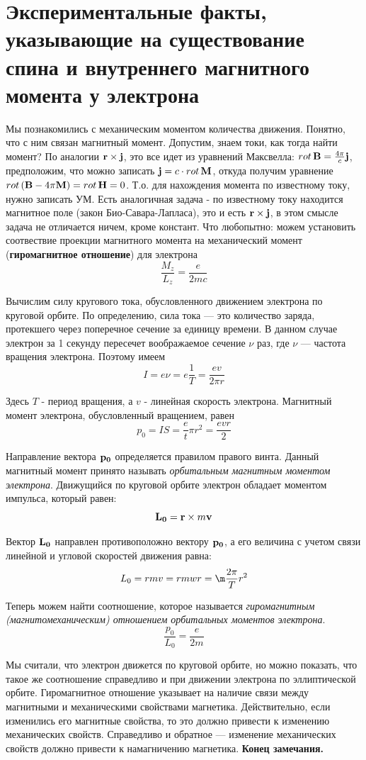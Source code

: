 \newpage
\chapter{Экспериментальные факты, указывающие на существование спина и внутреннего магнитного момента у электрона}
\par Мы познакомились с механическим моментом количества движения. Понятно, что с ним связан магнитный момент. Допустим, знаем токи, как тогда найти момент? По аналогии $\vb{r} \times \vb{j}$, это все идет из уравнений Максвелла: $rot \, \vb{B} = \frac{4 \pi}{c} \vb{j}$, предположим, что можно записать $\vb{j}=c \cdot rot \, \vb{M}$, откуда получим уравнение $rot \left( \vb{B} -4 \pi \vb{M} \right) = rot \, \vb{H} = 0$. Т.о. для нахождения момента по известному току, нужно записать УМ. Есть аналогичная задача - по известному току находится магнитное поле (закон Био-Савара-Лапласа), это и есть $\vb{r} \times \vb{j}$, в этом смысле задача не отличается ничем, кроме констант. Что любопытно: можем установить соотвествие проекции магнитного момента на механический момент (\textbf{гиромагнитное отношение}) для электрона 
$$\frac{M_z}{L_z} =\frac{e}{2mc}$$
\par \begin{remark}  Вычислим силу кругового тока, обусловленного движением электрона по круговой орбите. По определению, сила тока — это количество заряда, протекшего через поперечное сечение за единицу времени. В данном случае электрон за 1 секунду пересечет воображаемое сечение $\nu$ раз, где $\nu$ — частота вращения электрона. Поэтому имеем
$$I = e \nu = e \frac{1}{T} = \frac{e v}{2 \pi r}$$
\par Здесь $T$ - период вращения, а $v$ - линейная скорость электрона. Магнитный момент электрона, обусловленный вращением, равен
$$p_0 = I S = \frac{e}{t}\pi r^2= \frac{e v r}{2}$$
\par Направление вектора $\vb{p_0}$ определяется правилом правого винта. Данный магнитный момент принято называть \textit{орбитальным магнитным моментом электрона}. Движущийся по круговой орбите электрон обладает моментом импульса, который равен:
$$\vb{L_0} = \vb{r} \times m\vb{v}$$
\par Вектор $\vb{L_0}$ направлен противоположно вектору $\vb{p_0}$, а его величина с учетом связи линейной и угловой скоростей движения равна:
$$L_0 = rmv = rmwr = \m \frac{2\pi}{T}r^2 $$
\par Теперь можем найти соотношение, которое называется \textit{гиромагнитным (магнитомеханическим) отношением орбитальных моментов электрона}.
$$\frac{p_0}{L_0} = \frac{e}{2m}$$ 
\par Мы считали, что электрон движется по круговой орбите, но можно показать, что такое же соотношение справедливо и при движении электрона по эллиптической орбите. Гиромагнитное отношение указывает на наличие связи между магнитными и механическими свойствами магнетика. Действительно, если изменились его магнитные свойства, то это должно привести к изменению механических свойств. Справедливо и обратное — изменение механических свойств должно привести к намагничению магнетика. \textbf{Конец замечания.}
\end{remark}
